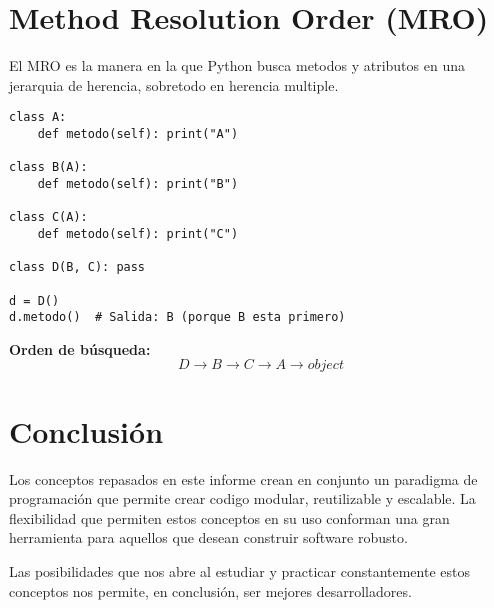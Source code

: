 \documentclass[a4paper,12pt]{article}
\begin{document}
\section{Method Resolution Order (MRO)}

El MRO es la manera en la que Python busca metodos y atributos en una jerarquia de herencia, sobretodo en herencia multiple.

\begin{lstlisting}[caption={MRO resolviendo herencia múltiple}]
class A:
    def metodo(self): print("A")

class B(A):
    def metodo(self): print("B")

class C(A):
    def metodo(self): print("C")

class D(B, C): pass

d = D()
d.metodo()  # Salida: B (porque B esta primero)
\end{lstlisting}

\textbf{Orden de búsqueda:}
\[
D \rightarrow B \rightarrow C \rightarrow A \rightarrow object
\]

\section{Conclusión}

Los conceptos repasados en este informe crean en conjunto un paradigma de programación que permite crear codigo modular, reutilizable y escalable. La flexibilidad que permiten estos conceptos en su uso conforman una gran herramienta para aquellos que desean construir software robusto.

Las posibilidades que nos abre al estudiar y practicar constantemente estos conceptos nos permite, en conclusión, ser mejores desarrolladores.
\end{document}
